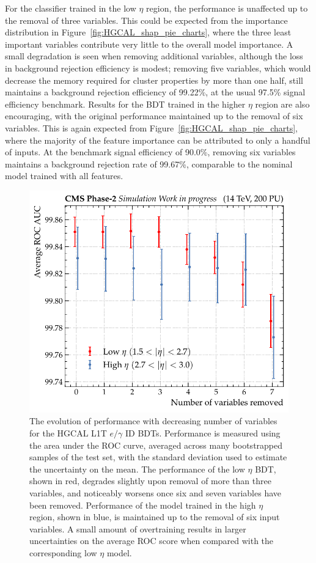 For the classifier trained in the low $\eta$ region, the performance is unaffected up to the removal of three variables. This could be expected from the importance distribution in Figure~\ref{fig:HGCAL_shap_pie_charts}, where the three least important variables contribute very little to the overall model importance. A small degradation is seen when removing additional variables, although the loss in background rejection efficiency is modest; removing five variables, which would decrease the memory required for cluster properties by more than one half, still maintains a background rejection efficiency of 99.22\%, at the usual 97.5\% signal efficiency benchmark.  Results for the BDT trained in the higher $\eta$ region are also encouraging, with the original performance maintained up to the removal of six variables. This is again expected from Figure~\ref{fig:HGCAL_shap_pie_charts}, where the majority of the feature importance can be attributed to only a handful of inputs. At the benchmark signal efficiency of 90.0\%, removing six variables maintains a background rejection rate of 99.67\%, comparable to the nominal model trained with all features.


\begin{figure}[htbp!]
\centering
\includegraphics[width=0.49\linewidth]{Figures/Detector/HGCAL/featureSelection/ROCs_low_high.pdf}\hfill%
\caption[The evolution of BDT performance with the number of variables used within the HGCAL L1T $e/\gamma$ identification BDTs.]{The evolution of performance with decreasing number of variables for the HGCAL L1T $e/\gamma$ ID BDTs. Performance is measured using the area under the ROC curve, averaged across many bootstrapped samples of the test set, with the standard deviation used to estimate the uncertainty on the mean. The performance of the low $\eta$ BDT, shown in red, degrades slightly upon removal of more than three variables, and noticeably worsens once six and seven variables have been removed. Performance of the model trained in the high $\eta$ region, shown in blue, is maintained up to the removal of six input variables. A small amount of overtraining results in larger uncertainties on the average ROC score when compared with the corresponding low $\eta$ model.}
\label{fig:HGCAL_egid_SBS}
\end{figure}

